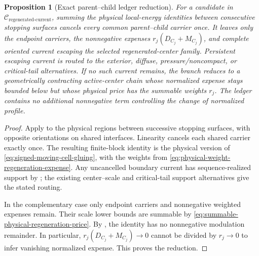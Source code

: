 \documentclass[11pt]{amsart}
\numberwithin{equation}{section}
\theoremstyle{plain}
\newtheorem{proposition}[proposition]{Proposition}
\theoremstyle{definition}
\theoremstyle{remark}
\newcommand{\Cregen}{\mathcal C_{\mathrm{regenerated\text{-}current}}}
\begin{document}
\begin{proposition}[Exact parent--child ledger reduction]
\label{prop:regenerated-current-ledger-reduction}
For a candidate in \(\Cregen\), summing the physical local-energy identities
between consecutive stopping surfaces cancels every common parent--child
carrier once.  It leaves only the endpoint carriers, the nonnegative expenses
\(r_j(D_{C_j}+M_{C_j})\), and complete oriented current escaping the selected
regenerated-center family.  Persistent escaping current is routed to the
exterior, diffuse, pressure/noncompact, or critical-tail alternatives.  If no
such current remains, the branch reduces to a geometrically contracting
active-center chain whose normalized expense stays bounded below but whose
physical price has the summable weights \(r_j\).  The ledger contains no
additional nonnegative term controlling the change of normalized profile.
\end{proposition}

\begin{proof}
Apply  to the physical regions between
successive stopping surfaces, with opposite orientations on shared
interfaces.  Linearity cancels each shared carrier exactly once.  The resulting
finite-block identity is the physical version of
\eqref{eq:signed-moving-cell-gluing}, with the weights from
\eqref{eq:physical-weight-regeneration-expense}.  Any uncancelled boundary
current has sequence-realized support by
; the existing center--scale
and critical-tail support alternatives give the stated routing.

In the complementary case only endpoint carriers and nonnegative weighted
expenses remain.  Their scale lower bounds are summable by
\eqref{eq:summable-physical-regeneration-price}.  By
, the identity has no
nonnegative modulation remainder.  In particular,
\(r_j(D_{C_j}+M_{C_j})\to0\) cannot be divided by \(r_j\to0\) to infer
vanishing normalized expense.  This proves the reduction.
\end{proof}
\end{document}
